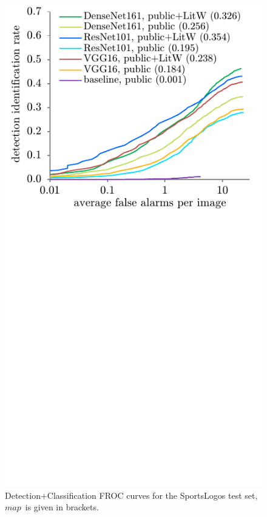 \documentclass[a4paper,twoside]{article}
\newcommand{\map}{$\mathit{map}$}
\begin{document}
%
\begin{figure}%
\centering%
\includegraphics[width=\linewidth, trim=0cm 8.5cm 0cm 0cm, clip]{img/classificationFrocFootball.pdf}%
\caption{Detection+Classification FROC curves for the Sports\-Logos test set, \map~is given in brackets.}%
\label{fig:classificationFrocFootball}
\end{figure}%
%
\end{document}
